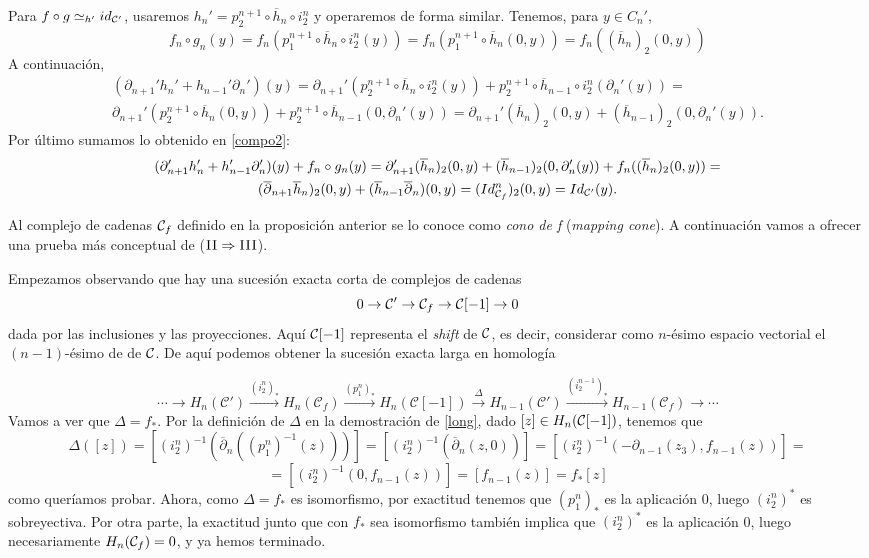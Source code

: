 \documentclass[HS.tex]{subfiles}
\begin{document}
\begin{dem}
Para $f \circ g \simeq_{h'} id_{\mathcal{C}'}$, usaremos $h_n' = p_2^{n+1} \circ \overline{h}_n \circ i_2^n$ y operaremos de forma similar. Tenemos, para $y\in C_n'$,
\begin{equation}\label{compo2}
f_n\circ g_n(y)=f_n(p_1^{n+1}\circ \overline{h}_n\circ i_2^n(y))=f_n(p_1^{n+1}\circ \overline{h}_n(0,y))=f_n((\overline{h}_n)_2(0,y))
\end{equation}
A continuación,
\begin{gather*}
(\partial_{n+1}'h_n'+h_{n-1}'\partial_n')(y)=\partial_{n+1}'(p_2^{n+1}\circ\overline{h}_n\circ i_2^n(y))+p_2^{n+1}\circ\overline{h}_{n-1}\circ i_2^n(\partial_n'(y))=\\
\partial_{n+1}'(p_2^{n+1}\circ\overline{h}_n(0,y))+p_2^{n+1}\circ\overline{h}_{n-1}(0,\partial_n'(y))=\partial_{n+1}'(\overline{h}_n)_2(0,y)+(\overline{h}_{n-1})_2(0,\partial_n'(y)).
\end{gather*}
Por último sumamos lo obtenido en \ref{compo2}:
\begin{gather*}
(\partial_{n+1}'h_n'+h_{n-1}'\partial_n')(y)+f_n\circ g_n(y)=\partial_{n+1}'(\overline{h}_n)_2(0,y)+(\overline{h}_{n-1})_2(0,\partial_n'(y))+f_n((\overline{h}_n)_2(0,y))=\\
(\overline{\partial}_{n+1}\overline{h}_n)_2(0,y)+(\overline{h}_{n-1}\overline{\partial}_n)(0,y)=(Id_{\mathcal{C}_f}^n)_2(0,y)=Id_{\mathcal{C}'}(y).
\end{gather*}
\QED
\end{dem}

\begin{nota}
Al complejo de cadenas $\mathcal{C}_f$ definido en la proposición anterior se lo conoce como \emph{cono de f} (\emph{mapping cone}). A continuación vamos a ofrecer una prueba más conceptual de ($\textsc{II}\Rightarrow \textsc{III}$). 

Empezamos observando que hay una sucesión exacta corta de complejos de cadenas
\[
0\to \mathcal{C}'\to\mathcal{C}_f\to \mathcal{C}[-1]\to 0 
\]
dada por las inclusiones y las proyecciones. Aquí $\mathcal{C}[-1]$ representa el \emph{shift} de $\mathcal{C}$, es decir, considerar como $n$-ésimo espacio vectorial el $(n-1)$-ésimo de de $\mathcal{C}$. De aquí podemos obtener la sucesión exacta larga en homología

\[
\cdots\to H_n(\mathcal{C}')\overset{(i_2^n)_*}{\to}H_n(\mathcal{C}_f)\overset{(p_1^n)_*}{\to}H_n(\mathcal{C}[-1])\overset{\Delta}{\to}H_{n-1}(\mathcal{C}')\overset{(i_2^{n-1})_*}{\to}H_{n-1}(\mathcal{C}_f)\to\cdots
\]
Vamos a ver que $\Delta=f_*$. Por la definición de $\Delta$ en la demostración de \ref{long}, dado $[z]\in H_n(\mathcal{C}[-1])$, tenemos que
\[
\Delta([z])=[(i_2^n)^{-1}(\overline{\partial}_n((p_1^n)^{-1}(z)))]=[(i_2^n)^{-1}(\overline{\partial}_n(z,0))]=[(i_2^n)^{-1}(-\partial_{n-1}(z_3),f_{n-1}(z))]=
\]
\[
=[(i_2^n)^{-1}(0,f_{n-1}(z))]=[f_{n-1}(z)]=f_*[z]
\]
como queríamos probar. Ahora, como $\Delta=f_*$ es isomorfismo, por exactitud tenemos que $(p_1^n)_*$ es la aplicación 0, luego $(i_2^n)^*$ es sobreyectiva. Por otra parte, la exactitud junto que con $f_*$ sea isomorfismo también implica que $(i_2^n)^*$ es la aplicación 0, luego necesariamente $H_n(\mathcal{C}_f)=0$, y ya hemos terminado. 

\end{nota}
\end{document}
